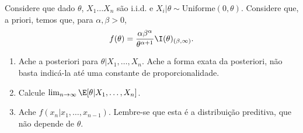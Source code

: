 \begin{exercise}
 \label{ex:pareto-uniform}
 Considere que dado $\theta$,
 $X_{1} \ldots X_{n}$ são i.i.d. e
 $X_{i}|\theta \sim \text{Uniforme}(0,\theta)$.
 Considere que, a priori, temos que,
 para $\alpha, \beta > 0$,
 \begin{align*}
  f(\theta) = \frac{\alpha \beta^{\alpha}}
  {\theta^{\alpha+1}}\I(\theta)_{(\beta,\infty)}.
 \end{align*}
 \begin{enumerate}[label=(\alph*)]
  \item Ache a posteriori para
  $\theta|X_{1},\ldots,X_{n}$.
  Ache a forma exata da posteriori,
  não basta indicá-la até uma constante de
  proporcionalidade.
  \item Calcule $\lim_{n \rightarrow \infty}{\E[\theta|X_{1},\ldots,X_{n}]}$.
  \item Ache $f(x_{n}|x_{1},\ldots,x_{n-1})$.
  Lembre-se que esta é a distribuição preditiva, 
  que não depende de $\theta$.
 \end{enumerate}
\end{exercise}

